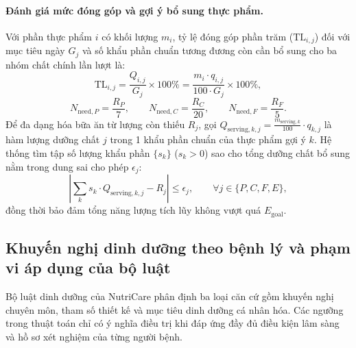 \paragraph{Đánh giá mức đóng góp và gợi ý bổ sung thực phẩm.}
Với phần thực phẩm $i$ có khối lượng $m_i$, tỷ lệ đóng góp phần trăm ($\mathrm{TL}_{i,j}$) đối với mục tiêu ngày $G_j$ và số khẩu phần chuẩn tương đương còn cần bổ sung cho ba nhóm chất chính lần lượt là:
\begin{equation}
    \mathrm{TL}_{i,j} = \frac{Q_{i,j}}{G_j} \times 100\% = \frac{m_i \cdot q_{i,j}}{100 \cdot G_j} \times 100\%,
    \label{eq:contribution-pct}
\end{equation}
\begin{equation}
    N_{\mathrm{need}, P} = \frac{R_P}{7}, \qquad
    N_{\mathrm{need}, C} = \frac{R_C}{20}, \qquad
    N_{\mathrm{need}, F} = \frac{R_F}{5}.
    \label{eq:servings-needed}
\end{equation}
Để đa dạng hóa bữa ăn từ lượng còn thiếu $R_j$, gọi $Q_{\mathrm{serving}, k, j} = \frac{m_{\mathrm{serving}, k}}{100} \cdot q_{k,j}$ là hàm lượng dưỡng chất $j$ trong 1 khẩu phần chuẩn của thực phẩm gợi ý $k$. Hệ thống tìm tập số lượng khẩu phần $\{s_k\}$ ($s_k > 0$) sao cho tổng dưỡng chất bổ sung nằm trong dung sai cho phép $\epsilon_j$:
\begin{equation}
    \left| \sum_{k} s_k \cdot Q_{\mathrm{serving}, k, j} - R_j \right| \le \epsilon_j, \qquad \forall j \in \{P, C, F, E\},
    \label{eq:food-exchange-opt}
\end{equation}
đồng thời bảo đảm tổng năng lượng tích lũy không vượt quá $E_{\mathrm{goal}}$.

\subsection{Khuyến nghị dinh dưỡng theo bệnh lý và phạm vi áp dụng của bộ luật}
\label{subsec:pathological-nutrition-rules}

Bộ luật dinh dưỡng của NutriCare phân định ba loại căn cứ gồm khuyến nghị chuyên môn, tham số thiết kế và mục tiêu dinh dưỡng cá nhân hóa. Các ngưỡng trong thuật toán chỉ có ý nghĩa điều trị khi đáp ứng đầy đủ điều kiện lâm sàng và hồ sơ xét nghiệm của từng người bệnh.

